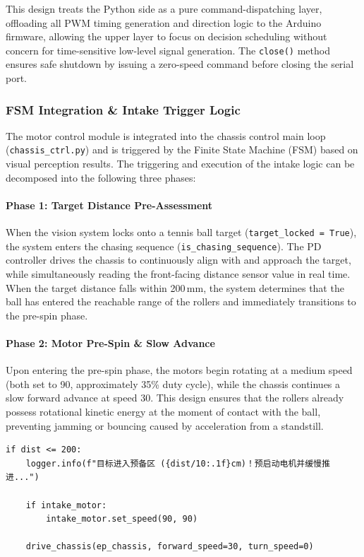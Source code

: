 This design treats the Python side as a pure command-dispatching layer, offloading all PWM timing generation and direction logic to the Arduino firmware, allowing the upper layer to focus on decision scheduling without concern for time-sensitive low-level signal generation. The \texttt{close()} method ensures safe shutdown by issuing a zero-speed command before closing the serial port.

\subsubsection{FSM Integration \& Intake Trigger Logic}
\label{sec:motor_fsm}

The motor control module is integrated into the chassis control main loop (\texttt{chassis\_ctrl.py}) and is triggered by the Finite State Machine (FSM) based on visual perception results. The triggering and execution of the intake logic can be decomposed into the following three phases:

\paragraph{Phase 1: Target Distance Pre-Assessment}

When the vision system locks onto a tennis ball target (\texttt{target\_locked = True}), the system enters the chasing sequence (\texttt{is\_chasing\_sequence}). The PD controller drives the chassis to continuously align with and approach the target, while simultaneously reading the front-facing distance sensor value in real time. When the target distance falls within 200\,mm, the system determines that the ball has entered the reachable range of the rollers and immediately transitions to the pre-spin phase.

\paragraph{Phase 2: Motor Pre-Spin \& Slow Advance}

Upon entering the pre-spin phase, the motors begin rotating at a medium speed (both set to 90, approximately 35\% duty cycle), while the chassis continues a slow forward advance at speed 30. This design ensures that the rollers already possess rotational kinetic energy at the moment of contact with the ball, preventing jamming or bouncing caused by acceleration from a standstill.

\begin{verbatim}
if dist <= 200:
    logger.info(f"目标进入预备区 ({dist/10:.1f}cm)！预启动电机并缓慢推进...")

    if intake_motor:
        intake_motor.set_speed(90, 90)

    drive_chassis(ep_chassis, forward_speed=30, turn_speed=0)
\end{verbatim}


